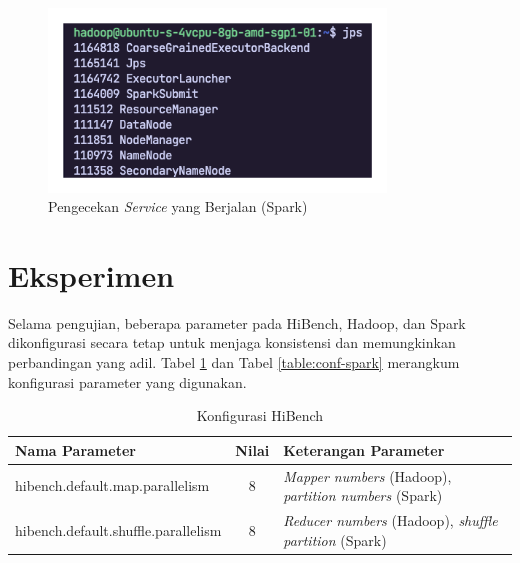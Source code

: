 \begin{enumerate}
\begin{figure}[h]
		    \includegraphics[width=0.8\textwidth]{figures/ch04/service-spark}
		    \caption{Pengecekan \textit{Service} yang Berjalan (Spark)}
		    \label{fig:service-spark}
		\end{figure}
\end{enumerate}

\newpage
\section{Eksperimen}
Selama pengujian, beberapa parameter pada HiBench, Hadoop, dan Spark dikonfigurasi secara tetap untuk menjaga konsistensi dan memungkinkan perbandingan yang adil. Tabel \ref{table:conf-hibench} dan Tabel \ref{table:conf-spark} merangkum konfigurasi parameter yang digunakan.

\begin{table}[h]
\caption{Konfigurasi HiBench}
\label{table:conf-hibench}
\scriptsize
\centering
\begin{tabular}{l c p{5cm}} 
\hline
\textbf{Nama Parameter} & \textbf{Nilai} & \textbf{Keterangan Parameter} \\ \hline
hibench.default.map.parallelism     & 8 & \textit{Mapper numbers} (Hadoop), \textit{partition numbers} (Spark)                          \\
hibench.default.shuffle.parallelism & 8 & \textit{Reducer numbers}  (Hadoop), \textit{shuffle partition} (Spark)\\ \hline                        
\end{tabular}
\end{table}

